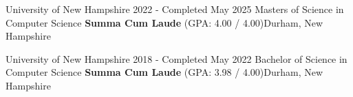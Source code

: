 \documentclass[letterpaper,11pt]{article}
\begin{document}
    \resumeSubheading
    {University of New Hampshire}{ 2022 - Completed May 2025}
    {Masters of Science in Computer Science \textbf{Summa Cum Laude} (GPA: 4.00 / 4.00)}{Durham, New Hampshire}

    \resumeSubheading
    {University of New Hampshire}{ 2018 - Completed May 2022}
    {Bachelor of Science in Computer Science \textbf{Summa Cum Laude} (GPA: 3.98 / 4.00)}{Durham, New Hampshire}
    \resumeItemListStart
    \resumeItemListEnd

    \resumeSubHeadingListEnd
\end{document}
